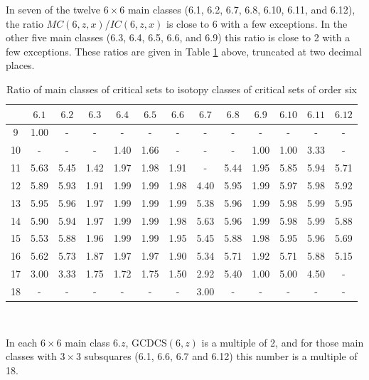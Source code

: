In seven of the twelve $6 \times 6$ main classes (6.1, 6.2, 6.7, 6.8,
6.10, 6.11, and 6.12), the ratio $MC(6,z,x)$/$IC(6,z,x)$ is close to 6 with a few exceptions.
In the other five main classes (6.3, 6.4, 6.5, 6.6, and 6.9) this ratio
is close to 2 with a few exceptions.  These ratios are given in Table \ref{eight} above, truncated at
two decimal places.

\begin{table}
\begin{center}
\caption{Ratio of main classes of critical sets to isotopy classes of critical sets of order six \vspace {3mm}}
\label{eight}
\begin{tabular}{|c|c|c|c|c|c|c|c|c|c|c|c|c|} \hline
& $6.1$ & $6.2$ & $6.3$ & $6.4$ & $6.5$ & $6.6$ & $6.7$ & $6.8$ & $6.9$ & $6.10$ & $6.11$ & $6.12$ \\
\hline
9 &   1.00 &   -  &  -   &  -   &  -   &  -   &  -   &  -   &   -  &  -   &  -   &  - \\
10 &   -   &   -  &  -   & 1.40 & 1.66 &  -   &  -   &  -   & 1.00 & 1.00 & 3.33 &  - \\
11 &  5.63 & 5.45 & 1.42 & 1.97 & 1.98 & 1.91 &  -   & 5.44 & 1.95 & 5.85 & 5.94 & 5.71  \\
12 &  5.89 & 5.93 & 1.91 & 1.99 & 1.99 & 1.98 & 4.40 & 5.95 & 1.99 & 5.97 & 5.98 & 5.92 \\
13 &  5.95 & 5.96 & 1.97 & 1.99 & 1.99 & 1.99 & 5.38 & 5.96 & 1.99 & 5.98 & 5.99 & 5.95 \\
14 &  5.90 & 5.94 & 1.97 & 1.99 & 1.99 & 1.98 & 5.63 & 5.96 & 1.99 & 5.98 & 5.99 & 5.88 \\
15 &  5.53 & 5.88 & 1.96 & 1.99 & 1.99 & 1.95 & 5.45 & 5.88 & 1.98 & 5.95 & 5.96 & 5.69 \\
16 &  5.62 & 5.73 & 1.87 & 1.97 & 1.97 & 1.90 & 5.34 & 5.71 & 1.92 & 5.71 & 5.88 & 5.15 \\
17 &  3.00 & 3.33 & 1.75 & 1.72 & 1.75 & 1.50 & 2.92 & 5.40 & 1.00 & 5.00 & 4.50 &  - \\
18 &   -   &   -  &  -   &  -   &  -   &  -   & 3.00 &  -   &  -   &  -   &  -   &  -  \\
\hline
\end{tabular}\vspace {3mm} \\
\end{center}
\end{table}

In each $6 \times 6$ main class $6.z$, GCDCS$(6,z)$ is a multiple of
2, and for those main classes with $3 \times 3$ subsquares (6.1, 6.6,
6.7 and 6.12) this number is a multiple of 18.

